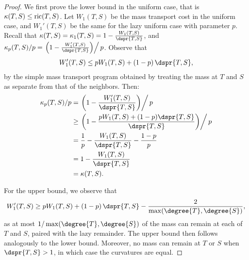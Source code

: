 \documentclass[11pt]{amsart}
\newcommand{\curvature}[2][]{%
    \ifthenelse{\equal{#1}{}}%
		{\kappa(#2)}%
		{\kappa_{#1}(#2)}%
}
\newcommand{\ric}[1]{
	\operatorname{ric}(#1)%
}
\begin{document}
\asymptotic*
\begin{proof}
	We first prove the lower bound in the uniform case, that is $\curvature{T,S} \le \ric{T,S}$.
	Let $W_1(T,S)$ be the mass transport cost in the uniform case, and $W_1'(T,S)$ be the same for the lazy uniform case with parameter $p$.
	Recall that $\curvature{T,S} = \curvature[1]{T,S} = 1 - \frac{W_1(T,S)}{\dspr{T,S}}$, and $\curvature[p]{T,S} / p = \left. \left(1 - \frac{W_1'(T,S)}{\dspr{T,S}}\right) \right/ p$.
	Observe that $$W_1'(T,S) \le pW_1(T,S) + (1-p) \, \dspr{T,S},$$ by the simple mass transport program obtained by treating the mass at $T$ and $S$ as separate from that of the neighbors.
	Then:
	\begin{align*}
		\curvature[p]{T,S} /p &= \left. \left(1 - \frac{W_1'(T,S)}{\dspr{T,S}}\right) \right/ p \\
		&\ge \left. \left(1 - \frac{pW_1(T,S) + (1-p)\dspr{T,S}}{\dspr{T,S}}\right) \right/ p \\
		&= \frac{1}{p} - \frac{W_1(T,S)}{\dspr{T,S}} - \frac{1-p}{p} \\
		&= 1 - \frac{W_1(T,S)}{\dspr{T,S}} \\
		&= \curvature{T,S}.
	\end{align*}

	For the upper bound, we observe that $$W_1'(T,S) \ge p W_1(T,S) + (1-p) \, \dspr{T,S} - \frac{2}{\max(\degree{T}, \degree{S})},$$ as at most $1 / \max(\degree{T},\degree{S})$ of the mass can remain at each of $T$ and $S$, paired with the lazy remainder.
	The upper bound then follows analogously to the lower bound.
	Moreover, no mass can remain at $T$ or $S$ when $\dspr{T,S} > 1$, in which case the curvatures are equal.
\end{proof}
\end{document}
